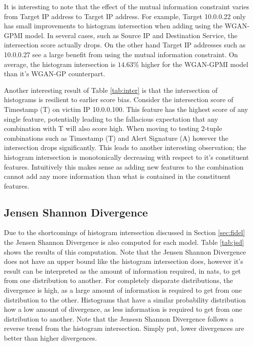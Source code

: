 It is interesting to note that the effect of the mutual information constraint varies from Target IP address to Target IP address. For example, Target 10.0.0.22 only has small improvements to histogram intersection when adding using the WGAN-GPMI model. In several cases, such as Source IP and Destination Service, the intersection score actually drops. On the other hand Target IP addresses such as 10.0.0.27 see a large benefit from using the mutual information constraint. On average, the histogram intersection is $14.63$\% higher for the WGAN-GPMI model than it's WGAN-GP counterpart.

Another interesting result of Table \ref{tab:inter} is that the intersection of histograms is resilient to earlier score bias. Consider the intersection score of Timestamp (T) on victim IP 10.0.0.100. This feature has the highest score of any single feature, potentially leading to the fallacious expectation that any combination with T will also score high. When moving to testing 2-tuple combinations such as Timestamp (T) and Alert Signature (A) however the intersection drops significantly. This leads to another interesting observation; the histogram intersection is monotonically decreasing with respect to it's constituent features. Intuitively this makes sense as adding new features to the combination cannot add any more information than what is contained in the constituent features.

\subsection{Jensen Shannon Divergence}

Due to the shortcomings of histogram intersection discussed in Section \ref{sec:fidel} the Jensen Shannon Divergence is also computed for each model. Table \ref{tab:jsd} shows the results of this computation. Note that the Jensen Shannon Divergence does not have an upper bound like the histogram intersection does, however it's result can be interpreted as the amount of information required, in nats, to get from one distribution to another. For completely disparate distributions, the divergence is high, as a large amount of information is required to get from one distribution to the other. Histograms that have a similar probability distribution how a low amount of divergence, as less information is required to get from one distribution to another. Note that the Jensesn Shannon Divergence follows a reverse trend from the histogram intersection. Simply put, lower divergences are better than higher divergences.

